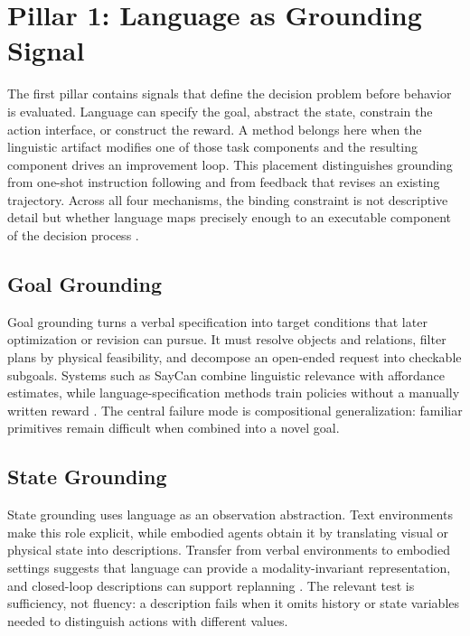 \section{Pillar 1: Language as Grounding Signal}
\label{sec:grounding}

The first pillar contains signals that define the decision problem before behavior is evaluated. Language can specify the goal, abstract the state, constrain the action interface, or construct the reward. A method belongs here when the linguistic artifact modifies one of those task components and the resulting component drives an improvement loop. This placement distinguishes grounding from one-shot instruction following and from feedback that revises an existing trajectory. Across all four mechanisms, the binding constraint is not descriptive detail but whether language maps precisely enough to an executable component of the decision process \citep{sutton2018reinforcement,macglashan2017interactive}.

\subsection{Goal Grounding}
\label{subsec:goal-grounding}

Goal grounding turns a verbal specification into target conditions that later optimization or revision can pursue. It must resolve objects and relations, filter plans by physical feasibility, and decompose an open-ended request into checkable subgoals. Systems such as SayCan combine linguistic relevance with affordance estimates, while language-specification methods train policies without a manually written reward \citep{ahn2022can,li2026ground}. The central failure mode is compositional generalization: familiar primitives remain difficult when combined into a novel goal.

\subsection{State Grounding}
\label{subsec:state-grounding}

State grounding uses language as an observation abstraction. Text environments make this role explicit, while embodied agents obtain it by translating visual or physical state into descriptions. Transfer from verbal environments to embodied settings suggests that language can provide a modality-invariant representation, and closed-loop descriptions can support replanning \citep{shridhar2020alfworld,bhat2024grounding}. The relevant test is sufficiency, not fluency: a description fails when it omits history or state variables needed to distinguish actions with different values.

